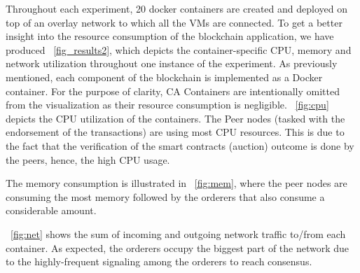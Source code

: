 Throughout each experiment, 20 docker containers are created and deployed on top of an overlay network to which all the \acp{VM} are connected. To get a better insight into the resource consumption of the blockchain application, we have produced \figureautorefname~\ref{fig_results2}, which depicts the container-specific \ac{CPU}, memory and network utilization throughout one instance of the experiment. %
As previously mentioned, each component of the blockchain is implemented as a Docker container. For the purpose of clarity, \ac{CA} Containers are intentionally omitted from the visualization as their resource consumption is negligible. 
\figureautorefname~\ref{fig:cpu} depicts the \ac{CPU} utilization of the containers. The Peer nodes (tasked with the endorsement of the transactions) are using most \ac{CPU} resources. This is due to the fact that the verification of the smart contracts (auction) outcome is done by the peers, hence, the high \ac{CPU} usage. 

The memory consumption is illustrated in \figureautorefname~\ref{fig:mem}, where the peer nodes are consuming the most memory followed by the orderers that also consume a considerable amount.

\figureautorefname~\ref{fig:net} shows the sum of incoming and outgoing network traffic to/from each container. As expected, the orderers occupy the biggest part of the network due to the highly-frequent signaling among the orderers to reach consensus. 


